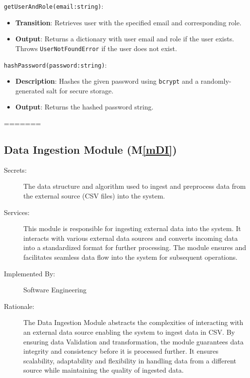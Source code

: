 \documentclass[12pt, titlepage]{article}
\newcommand{\mref}[1]{M\ref{#1}}
\begin{document}
\begin{description}
\begin{description}
  \item
  \texttt{getUserAndRole(email:string)}:
  \item
  \begin{itemize}
    \item \textbf{Transition}: Retrieves user with the specified email and
    corresponding role.
  \end{itemize}
  \item
  \begin{itemize}
    \item \textbf{Output}: Returns a dictionary with user email and role if the user exists. Throws \texttt{UserNotFoundError} if the user does not exist.
  \end{itemize}

  \item[Local Function:]
  \item
  \texttt{hashPassword(password:string)}:
  \item
  \begin{itemize}
    \item \textbf{Description}: Hashes the given password using \texttt{bcrypt}
    and a randomly-generated salt for secure storage.
  \end{itemize}
  \item 
  \begin{itemize}
    \item \textbf{Output}: Returns the hashed password string.
  \end{itemize}
=======
\subsection{Data Ingestion Module (\mref{mDI})}
\begin{description}
  \item[Secrets:] The data structure and algorithm used to ingest and preprocess data from
  the external source (CSV files) into the system.
  \item[Services:] This module is responsible for ingesting external data into the system.
  It interacts with various external data sources and converts incoming data into a 
  standardized format for further processing. The module ensures and facilitates seamless
  data flow into the system for subsequent operations.
  \item[Implemented By:] Software Engineering
  \item[Rationale:] The Data Ingestion Module abstracts the complexities of interacting with
  an external data source enabling the system to ingest data in CSV. By ensuring data Validation
  and transformation, the module guarantees data integrity and consistency before it is processed
  further. It ensures scalability, adaptability and flexibility in handling data from a different
  source while maintaining the quality of ingested data.
\end{description}


\end{description}
\end{description}
\end{document}
